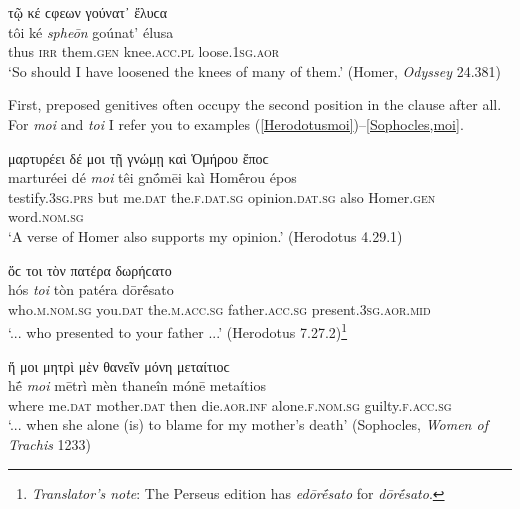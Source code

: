 \begin{exe}
\ex τῷ κέ ϲφεων γούνατ᾽ ἔλυϲα\\
\gll tôi ké \emph{spheōn} goúnat' élusa\\
thus \textsc{irr} them.\textsc{gen} knee.\textsc{acc.pl} loose.\textsc{1sg.aor}\\
\trans `So should I have loosened the knees of many of them.' (Homer, \textit{Odyssey} 24.381)
\label{Homer9}
\end{exe}

First, preposed genitives often occupy the second position in the clause after all. For \textit{moi} and \textit{toi} I refer you to examples (\ref{Herodotusmoi})--\ref{Sophocles,moi}. 

\begin{exe}
\ex μαρτυρέει δέ μοι τῇ γνώμῃ καὶ Ὁμήρου ἔποϲ\\
\gll marturéei dé \emph{moi} têi gnṓmēi kaì Homḗrou épos\\
testify.\textsc{3sg.prs} but me.\textsc{dat} the.\textsc{f.dat.sg}
opinion.\textsc{dat.sg} also Homer.\textsc{gen} word.\textsc{nom.sg}\\
\trans `A verse of Homer also supports my opinion.' (Herodotus 4.29.1)
\label{Herodotusmoi}
\end{exe}

\begin{exe}
\ex ὅϲ τοι τὸν πατέρα δωρήϲατο\\
\gll hós \emph{toi} tòn patéra dōrḗsato\\
who.\textsc{m.nom.sg} you.\textsc{dat} the.\textsc{m.acc.sg}
father.\textsc{acc.sg} present.\textsc{3sg.aor.mid}\\
\trans `... who presented to your father ...' (Herodotus 7.27.2)\footnote{\emph{Translator's note}: The Perseus edition has \textit{edōrḗsato} for \textit{dōrḗsato}.}
\label{Herodotustoi}
\end{exe}

\begin{exe}
\ex ἥ μοι μητρὶ μὲν θανεῖν μόνη μεταίτιοϲ\\
\gll hḗ \emph{moi} mētrì mèn thaneîn mónē metaítios\\
where me.\textsc{dat} mother.\textsc{dat} then die.\textsc{aor.inf} alone.\textsc{f.nom.sg} guilty.\textsc{f.acc.sg}\\
\trans `... when she alone (is) to blame for my mother's death' (Sophocles, \textit{Women of Trachis} 1233)
\label{Sophocles,moi}
\end{exe}

